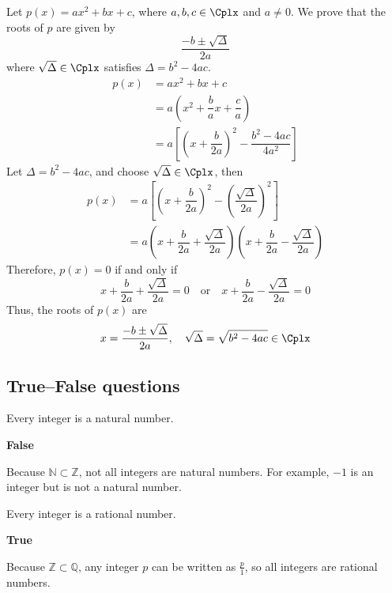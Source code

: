\begin{myproof}
    Let $p(x) = ax^2+bx+c$, where $a,b,c \in \Cplx$ and $a \ne 0$. We prove that the roots of $p$ are given by
    $$ \dfrac{-b \pm \sqrt{\Delta}}{2a} $$
    where $\sqrt{\Delta} \in \Cplx$ satisfies $\Delta = b^2-4ac$.
    \begin{align*}
        p(x) &= ax^2+bx+c\\
             &= a\left(x^2+\dfrac{b}{a}x+\dfrac{c}{a}\right)\\
             &= a\left[\left(x+\dfrac{b}{2a}\right)^2-\dfrac{b^2-4ac}{4a^2}\right]
    \end{align*}
    Let $\Delta = b^2-4ac$, and choose $\sqrt{\Delta} \in \Cplx$, then
    \begin{align*}
        p(x) &= a\left[\left(x+\dfrac{b}{2a}\right)^2-\left(\dfrac{\sqrt{\Delta}}{2a}\right)^2\right] \\
        &=a\left(x+\dfrac{b}{2a}+\dfrac{\sqrt{\Delta}}{2a}\right)\left(x+\dfrac{b}{2a}-\dfrac{\sqrt{\Delta}}{2a}\right)
    \end{align*}
    Therefore, $p(x)=0$ if and only if
    $$x+\dfrac{b}{2a}+\dfrac{\sqrt{\Delta}}{2a}=0 \quad\text{or}\quad x+\dfrac{b}{2a}-\dfrac{\sqrt{\Delta}}{2a}=0$$
    Thus, the roots of $p(x)$ are
    $$x=\dfrac{-b \pm \sqrt{\Delta}}{2a}, \quad \sqrt{\Delta}=\sqrt{b^2-4ac} \in \Cplx$$
\end{myproof}

\subsection*{True--False questions}


\begin{chapex} %
\label{cqGettingStartedTFBegin}
Every integer is a natural number.
\end{chapex}

\begin{mysolution}
    \textbf{False}

    Because $\mathbb{N} \subset \mathbb{Z}$, not all integers are natural numbers. For example, $-1$ is an integer but is not a natural number.
\end{mysolution}

\begin{chapex} %
Every integer is a rational number.
\end{chapex}

\begin{mysolution}
    \textbf{True}

    Because $\mathbb{Z} \subset \mathbb{Q}$, any integer $p$ can be written as $\frac{p}{1}$, so all integers are rational numbers.
\end{mysolution}

